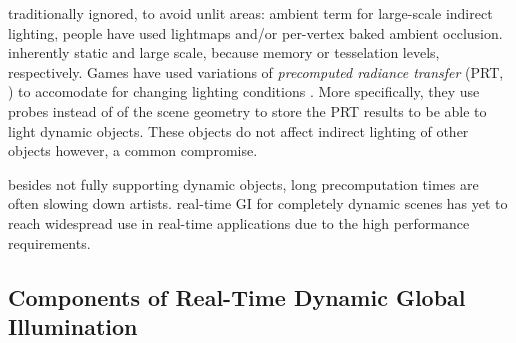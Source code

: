 \begin{outline}
\1 traditionally ignored, to avoid unlit areas: ambient term
\1 for large-scale indirect lighting, people have used lightmaps and/or per-vertex baked ambient occlusion. inherently static and large scale, because memory or tesselation levels, respectively.
\1 Games have used variations of \emph{precomputed radiance transfer} (PRT, \cite{sloan:2002:PRT}) to accomodate for changing lighting conditions \cite{stefanov:2012:PRTinFarCry3}. More specifically, they use probes instead of of the scene geometry to store the PRT results to be able to light dynamic objects. These objects do not affect indirect lighting of other objects however, a common compromise.

\1 besides not fully supporting dynamic objects, long precomputation times are often slowing down artists.
\1 real-time GI for completely dynamic scenes has yet to reach widespread use in real-time applications due to the high performance requirements.
\end{outline}


\subsection{Components of Real-Time Dynamic Global Illumination}
\label{sec:componentsOfGI}

